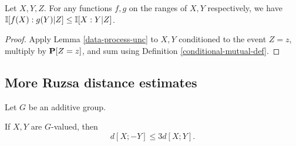 \begin{lemma}\label{data-process}\leanok Let $X,Y,Z$. For any functions $f, g$
on the ranges of $X, Y$ respectively, we have $\mathbb{I}[f(X) : g(Y )|Z] \leq \mathbb{I}[X :Y |Z]$.
\end{lemma}

\begin{proof}  Apply Lemma \ref{data-process-unc} to $X,Y$ conditioned to the event $Z=z$, multiply by ${\bf P}[Z=z]$, and sum using Definition \ref{conditional-mutual-def}.
\end{proof}

\subsection{More Ruzsa distance estimates}

Let $G$ be an additive group.

\begin{lemma}\label{sign-flip}\leanok
  If $X,Y$ are $G$-valued, then
  $$  d[X ; -Y]  \leq 3 d[X;Y].$$
\end{lemma}

